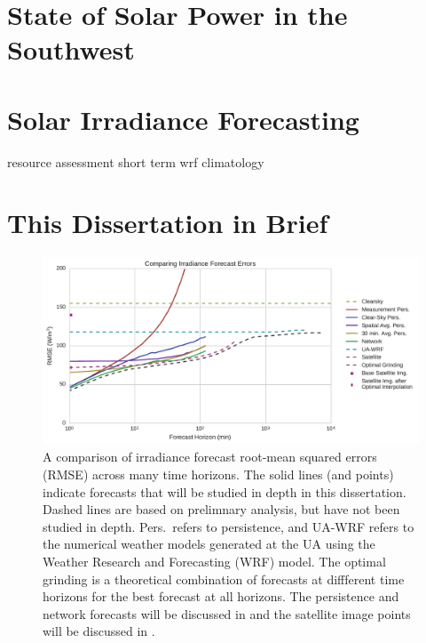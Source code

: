 \section{State of Solar Power in the Southwest}

\section{Solar Irradiance Forecasting}
resource assessment
short term
wrf
climatology

\section{This Dissertation in Brief}

\begin{figure}[h]
\includegraphics[width=\textwidth]{figs/timehorizon.pdf}
\caption[Irradiance forecast errors across forecast horizons]{A
  comparison of irradiance forecast root-mean squared errors (RMSE)
  across many time horizons. The solid lines (and points) indicate
  forecasts that will be studied in depth in this dissertation. Dashed
  lines are based on prelimnary analysis, but have not been studied in
  depth. Pers.\ refers to persistence, and UA-WRF refers to the
  numerical weather models generated at the UA using the Weather
  Research and Forecasting (WRF) model. The optimal grinding is a
  theoretical combination of forecasts at diffferent time horizons for
  the best forecast at all horizons. The persistence and network
  forecasts will be discussed in  and the satellite
  image points will be discussed in .}
\label{fig:bullshitplot}
\end{figure}




